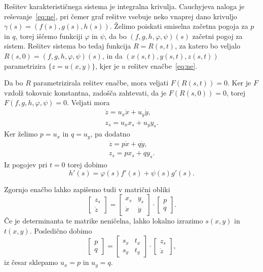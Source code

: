 Rešitev karakterističnega sistema je integralna krivulja.
Cauchyjeva naloga je reševanje~\eqref{eq:ne}, pri čemer graf rešitve vsebuje
neko vnaprej dano krivuljo $\gamma(s) = (f(s), g(s), h(s))$.
Želimo poiskati smiselna začetna pogoja za $p$ in $q$, torej iščemo funkciji
$\varphi$ in $\psi$, da bo $(f, g, h, \varphi, \psi)(s)$ začetni pogoj za
sistem.
Rešitev sistema bo tedaj funkcija $R = R(s,t)$, za katero bo veljalo $R(s,0) =
(f, g, h, \varphi, \psi)(s)$, in da $(x(s, t), y(s, t), z(s, t))$ parametrizira
$\{z = u(x, y)\}$, kjer je $u$ rešitev enačbe~\eqref{eq:ne}.

Da bo $R$ parametrizirala rešitev enačbe, mora veljati $F(R(s, t)) = 0$.
Ker je $F$ vzdolž tokovnic konstantna, zadošča zahtevati, da je $F(R(s, 0)) =
0$, torej $F(f, g, h, \varphi, \psi) = 0$.
Veljati mora
\begin{gather*}
  \dot{z} = u_x \dot{x} + u_y \dot{y}, \\
  z_s = u_x x_s + u_y y_s.
\end{gather*}
Ker želimo $p = u_x$ in $q = u_y$, pa dodatno
\begin{gather*}
  \dot{z} = p \dot{x} + q \dot{y}, \\
  z_s = p x_s + q y_s.
\end{gather*}
Iz pogojev pri $t=0$ torej dobimo
\[
  h'(s) = \varphi(s) f'(s) + \psi(s) g'(s).
\]

Zgornjo enačbo lahko zapišemo tudi v matrični obliki
\begin{equation}
  \label{eq:matricna-oblika}
  \begin{bmatrix}
	z_s \\ \dot{z}
  \end{bmatrix}
  =
  \begin{bmatrix}
	x_s & y_s \\
	\dot{x} & \dot{y}
  \end{bmatrix}
  \cdot
  \begin{bmatrix}
	p \\ q
  \end{bmatrix}.
\end{equation}
Če je determinanta te matrike neničelna, lahko lokalno izrazimo $s(x, y)$ in
$t(x, y)$.
Posledično dobimo
\[
  \begin{bmatrix}
	p \\ q
  \end{bmatrix}
  =
  \begin{bmatrix}
	s_x & t_x \\
	s_y & t_y
  \end{bmatrix}
  \cdot
  \begin{bmatrix}
	z_s \\ \dot{z}
  \end{bmatrix},
\]
iz česar sklepamo $u_x = p$ in $u_y = q$.

